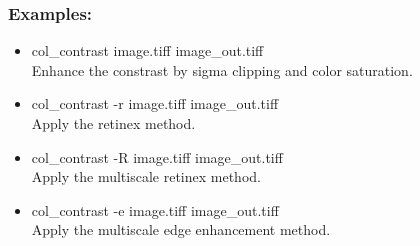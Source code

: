 \subsubsection*{Examples:}
\begin{itemize}
\baselineskip=0.4truecm
\itemsep=0.1truecm
\item col\_contrast image.tiff image\_out.tiff\\
Enhance the constrast by sigma clipping and color saturation.
\item col\_contrast -r image.tiff image\_out.tiff\\
Apply the retinex method.
\item col\_contrast -R image.tiff image\_out.tiff\\
Apply the multiscale retinex method.
\item col\_contrast -e image.tiff image\_out.tiff\\
Apply the multiscale edge enhancement method.
\end{itemize}
 
